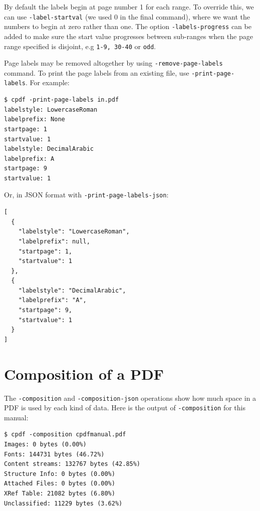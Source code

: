\documentclass{book}
\begin{document}
\noindent By default the labels begin at page number 1 for each range. To override this, we can use \texttt{-label-startval} (we used $0$ in the final command), where we want the numbers to begin at zero rather than one. The option \texttt{-labels-progress} can be added to make sure the  start value progresses between sub-ranges when the page range specified is disjoint, e.g \texttt{1-9, 30-40} or \texttt{odd}.

Page labels may be removed altogether by using \texttt{-remove-page-labels} command. To print the page labels from an existing file, use \texttt{-print-page-labels}. For example:
\begin{framed}\small\begin{verbatim}$ cpdf -print-page-labels in.pdf
labelstyle: LowercaseRoman
labelprefix: None
startpage: 1
startvalue: 1
labelstyle: DecimalArabic
labelprefix: A
startpage: 9
startvalue: 1
\end{verbatim}
\end{framed}\pagestyle{empty}\thispagestyle{fancy}

\noindent Or, in JSON format with \texttt{-print-page-labels-json}:

\begin{framed}\small\begin{verbatim}[
  {
    "labelstyle": "LowercaseRoman",
    "labelprefix": null,
    "startpage": 1,
    "startvalue": 1
  },
  {
    "labelstyle": "DecimalArabic",
    "labelprefix": "A",
    "startpage": 9,
    "startvalue": 1
  }
]
\end{verbatim}
\end{framed}\pagestyle{empty}

\section{Composition of a PDF}

The \texttt{-composition} and \texttt{-composition-json} operations show how much space in a PDF is used by each kind of data. Here is the output of \texttt{-composition} for this manual:

\begin{framed}\small\begin{verbatim}$ cpdf -composition cpdfmanual.pdf
Images: 0 bytes (0.00%)
Fonts: 144731 bytes (46.72%)
Content streams: 132767 bytes (42.85%)
Structure Info: 0 bytes (0.00%)
Attached Files: 0 bytes (0.00%)
XRef Table: 21082 bytes (6.80%)
Unclassified: 11229 bytes (3.62%)
\end{verbatim}
\end{framed}\pagestyle{empty}\thispagestyle{fancy}
\end{document}
